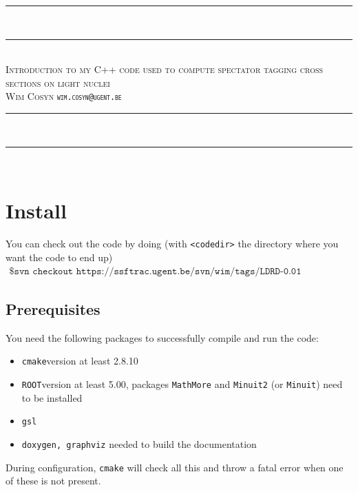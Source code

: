 \documentclass[11pt]{article}
\begin{document}
\begin{center}
\rule{\textwidth}{2pt} \\ [-0.8\baselineskip]
\rule{\textwidth}{1pt} \\ \vspace{8pt}
{\Large \textsc{Introduction to my C++ code used to compute spectator tagging 
cross sections on light nuclei}} \\
\vspace{10pt}
\textsc{Wim Cosyn \texttt{wim.cosyn@ugent.be}}
\end{center}
\rule{\textwidth}{1pt} \\ [-0.75\baselineskip]
\rule{\textwidth}{2pt} \\ [2\baselineskip]

\section{Install}
You can check out the code by doing (with \texttt{<codedir>} the directory 
where 
you want the code to end up)
\begin{align*}
	\texttt{\$ svn checkout https://ssftrac.ugent.be/svn/wim/tags/LDRD-0.01 
<codedir>}
\end{align*}

\subsection{Prerequisites}
You need the following packages to successfully compile and run the code:
\begin{itemize}
 \item \texttt{cmake}\quad version at least 2.8.10
\item \texttt{ROOT}\quad version at least 5.00, packages \texttt{MathMore} and 
\texttt{Minuit2} (or \texttt{Minuit}) need to be installed
\item \texttt{gsl}
\item \texttt{doxygen, graphviz} \quad needed to build the documentation
\end{itemize}
During 
configuration, \texttt{cmake} will check all this and throw a fatal error 
when one of these is not present.
\end{document}
